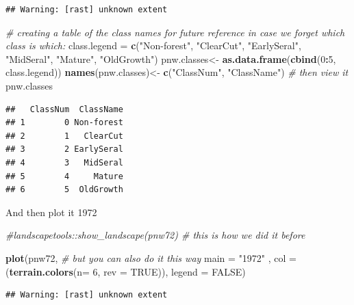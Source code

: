 \documentclass[
]{article}
\newenvironment{Shaded}{\begin{snugshade}}{\end{snugshade}}
\newcommand{\AttributeTok}[1]{\textcolor[rgb]{0.13,0.29,0.53}{#1}}
\newcommand{\CommentTok}[1]{\textcolor[rgb]{0.56,0.35,0.01}{\textit{#1}}}
\newcommand{\ConstantTok}[1]{\textcolor[rgb]{0.56,0.35,0.01}{#1}}
\newcommand{\DecValTok}[1]{\textcolor[rgb]{0.00,0.00,0.81}{#1}}
\newcommand{\FunctionTok}[1]{\textcolor[rgb]{0.13,0.29,0.53}{\textbf{#1}}}
\newcommand{\NormalTok}[1]{#1}
\newcommand{\OtherTok}[1]{\textcolor[rgb]{0.56,0.35,0.01}{#1}}
\newcommand{\SpecialCharTok}[1]{\textcolor[rgb]{0.81,0.36,0.00}{\textbf{#1}}}
\newcommand{\StringTok}[1]{\textcolor[rgb]{0.31,0.60,0.02}{#1}}
\begin{document}
\begin{verbatim}
## Warning: [rast] unknown extent
\end{verbatim}

\begin{Shaded}
\begin{Highlighting}[]
  \CommentTok{\# creating a table of the class names for future reference in case we forget which class is which:}
\NormalTok{class.legend }\OtherTok{=} \FunctionTok{c}\NormalTok{(}\StringTok{"Non{-}forest"}\NormalTok{,}
                 \StringTok{"ClearCut"}\NormalTok{,}
                 \StringTok{"EarlySeral"}\NormalTok{,}
                 \StringTok{"MidSeral"}\NormalTok{,}
                 \StringTok{"Mature"}\NormalTok{,}
                 \StringTok{"OldGrowth"}\NormalTok{)}
\NormalTok{pnw.classes}\OtherTok{\textless{}{-}} \FunctionTok{as.data.frame}\NormalTok{(}\FunctionTok{cbind}\NormalTok{(}\DecValTok{0}\SpecialCharTok{:}\DecValTok{5}\NormalTok{, class.legend))}
\FunctionTok{names}\NormalTok{(pnw.classes)}\OtherTok{\textless{}{-}} \FunctionTok{c}\NormalTok{(}\StringTok{"ClassNum"}\NormalTok{, }\StringTok{"ClassName"}\NormalTok{)}
\CommentTok{\# then view it}
\NormalTok{pnw.classes}
\end{Highlighting}
\end{Shaded}

\begin{verbatim}
##   ClassNum  ClassName
## 1        0 Non-forest
## 2        1   ClearCut
## 3        2 EarlySeral
## 4        3   MidSeral
## 5        4     Mature
## 6        5  OldGrowth
\end{verbatim}

And then plot it 1972

\begin{Shaded}
\begin{Highlighting}[]
\CommentTok{\#landscapetools::show\_landscape(pnw72)  \# this is how we did it before}

\FunctionTok{plot}\NormalTok{(pnw72, }\CommentTok{\# but you can also do it this way}
      \AttributeTok{main =} \StringTok{"1972"}\NormalTok{ , }\AttributeTok{col =}\NormalTok{ (}\FunctionTok{terrain.colors}\NormalTok{(}\AttributeTok{n=} \DecValTok{6}\NormalTok{, }\AttributeTok{rev =} \ConstantTok{TRUE}\NormalTok{)), }\AttributeTok{legend =} \ConstantTok{FALSE}\NormalTok{)}
\end{Highlighting}
\end{Shaded}

\begin{verbatim}
## Warning: [rast] unknown extent
\end{verbatim}
\end{document}
